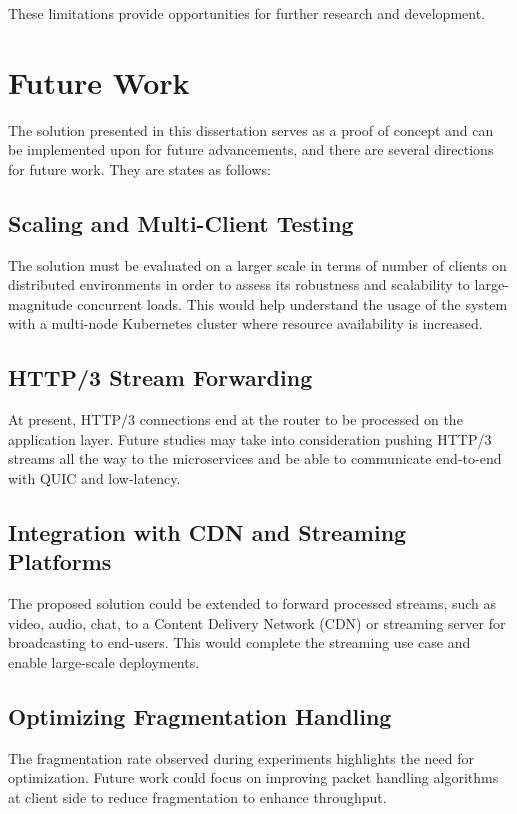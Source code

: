 These limitations provide opportunities for further research and development.

\section{Future Work}

The solution presented in this dissertation serves as a proof of concept and can be implemented upon for future advancements, and there are several directions for future work. They are states as follows:

\subsection{Scaling and Multi-Client Testing}
The solution must be evaluated on a larger scale in terms of number of clients on distributed environments in order to assess its robustness and scalability to large-magnitude concurrent loads. This would help understand the usage of the system with a multi-node Kubernetes cluster where resource availability is increased.

\subsection{HTTP/3 Stream Forwarding}
At present, HTTP/3 connections end at the router to be processed on the application layer. Future studies may take into consideration pushing HTTP/3 streams all the way to the microservices and be able to communicate end-to-end with QUIC and low-latency.

\subsection{Integration with CDN and Streaming Platforms}
The proposed solution could be extended to forward processed streams, such as video, audio, chat, to a Content Delivery Network (CDN) or streaming server for broadcasting to end-users. This would complete the streaming use case and enable large-scale deployments.

\subsection{Optimizing Fragmentation Handling}
The fragmentation rate observed during experiments highlights the need for optimization. Future work could focus on improving packet handling algorithms at client side to reduce fragmentation to enhance throughput.

